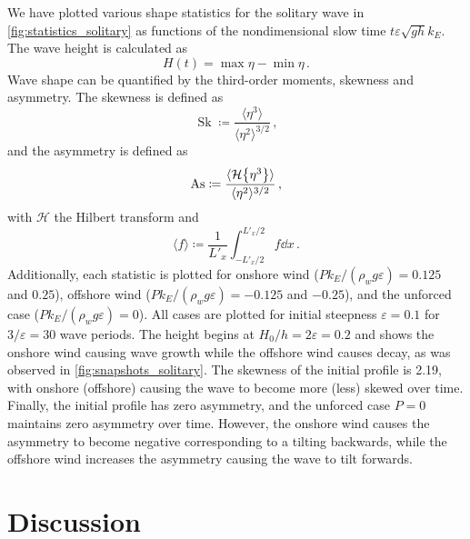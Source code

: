 \documentclass{jfm}
\DeclareMathOperator{\Sk}{Sk}
\DeclareMathOperator{\As}{As}
\newcommand{\hilbert}{\mathcal{H}}
\renewcommand*{\epsilon}{\varepsilon}
\begin{document}
We have plotted various shape statistics for the solitary wave in
\cref{fig:statistics_solitary} as functions of the nondimensional slow
time $t \epsilon \sqrt{g h} k_E$.
The  wave height is calculated as
\begin{equation}
  H(t) = \max{\eta} - \min{\eta} \,.
  \label{eq:height_def}
\end{equation}
Wave shape can be quantified by the third-order moments, skewness and
asymmetry.
The  skewness is defined as
\begin{equation}
  \Sk \coloneqq \frac{\langle \eta^3 \rangle}{\langle \eta^2
  \rangle^{3/2}} \,,
  \label{eq:skew_def}
\end{equation}
and the  asymmetry is defined as
\begin{equation}
  \As \coloneqq \frac{\langle \hilbert \Bqty{\eta^3} \rangle}{\langle
    \eta^2 \rangle^{3/2}} \,,
  \label{eq:asym_def}
\end{equation}
with $\hilbert$ the Hilbert transform and
\begin{equation}
  \langle f \rangle \coloneqq \frac{1}{L'_x} \int_{-L'_x/2}^{L'_x/2} f
  \dd{x} \,.
\end{equation}
Additionally, each statistic is plotted for onshore wind ($P
k_E/(\rho_w g \epsilon) = 0.125$ and $0.25$), offshore wind ($P
k_E/(\rho_w g \epsilon) = -0.125$ and $-0.25$), and the unforced case
($P k_E/(\rho_w g \epsilon) = 0$).
All cases are plotted for initial steepness $\epsilon = 0.1$ for
$3/\epsilon = 30$ wave periods.
The height  begins at $H_0/h = 2
\epsilon = 0.2$ and shows the onshore wind
causing wave growth while the offshore wind causes decay, as was
observed in \cref{fig:snapshots_solitary}.
The skewness of the initial profile is \num{2.19}, with onshore
(offshore) causing the wave to become more (less) skewed over time.
Finally, the initial profile has zero asymmetry, and the unforced case
$P=0$ maintains zero asymmetry over time.
However, the onshore wind causes the asymmetry to become negative
corresponding to a tilting backwards, while the offshore wind increases
the asymmetry causing the wave to tilt forwards.

\section{Discussion}
\end{document}
